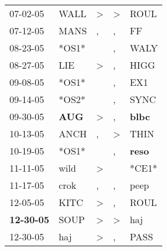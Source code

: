 \begin{supertabular}{p{0.07\textwidth}p{0.06\textwidth}p{0.02\textwidth}p{0.02\textwidth}p{0.06\textwidth}}
          07-02-05\textsuperscript{} &           WALL\textsuperscript{} &     \textgreater &     \textgreater &           ROUL\textsuperscript{} \\
          07-12-05\textsuperscript{} &           MANS\textsuperscript{} &                , &                , &             FF\textsuperscript{} \\
          08-23-05\textsuperscript{} &                            *OS1* &                  &                , &           WALY\textsuperscript{} \\
          08-27-05\textsuperscript{} &            LIE\textsuperscript{} &     \textgreater &                , &           HIGG\textsuperscript{} \\
          09-08-05\textsuperscript{} &                            *OS1* &                  &                , &            EX1\textsuperscript{} \\
          09-14-05\textsuperscript{} &                            *OS2* &                  &                , &           SYNC\textsuperscript{} \\
          09-30-05\textsuperscript{} &   \textbf{AUG\textsuperscript{}} &     \textgreater &                , &  \textbf{blbc\textsuperscript{}} \\
          10-13-05\textsuperscript{} &           ANCH\textsuperscript{} &                , &     \textgreater &           THIN\textsuperscript{} \\
          10-19-05\textsuperscript{} &                            *OS1* &                  &                , &  \textbf{reso\textsuperscript{}} \\
          11-11-05\textsuperscript{} &           wild\textsuperscript{} &     \textgreater &                  &                            *CE1* \\
          11-17-05\textsuperscript{} &           crok\textsuperscript{} &                , &                , &           peep\textsuperscript{} \\
          12-05-05\textsuperscript{} &           KITC\textsuperscript{} &     \textgreater &                , &           ROUL\textsuperscript{} \\
 \textbf{12-30-05\textsuperscript{}} &           SOUP\textsuperscript{} &     \textgreater &     \textgreater &            haj\textsuperscript{} \\
          12-30-05\textsuperscript{} &            haj\textsuperscript{} &     \textgreater &                , &           PASS\textsuperscript{} \\

\end{supertabular}
